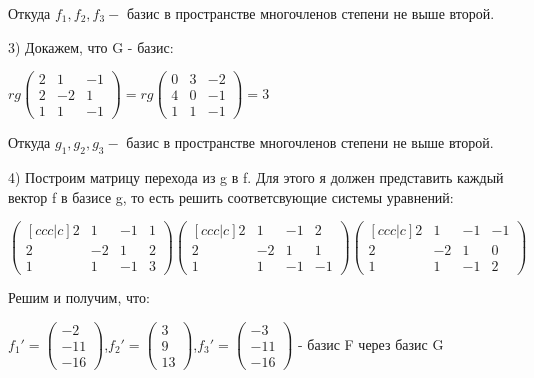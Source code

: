 \documentclass{article}
\begin{document}
Откуда $f_1,f_2,f_3 -$ базис в пространстве многочленов степени не выше второй.

3) Докажем, что G - базис:

$rg \begin{pmatrix}
    2 & 1 & -1 \\
    2 & -2 & 1 \\
    1 & 1 & -1
\end{pmatrix} = rg \begin{pmatrix}
    0 & 3 & -2 \\
    4 & 0 & -1 \\
    1& 1 & -1
\end{pmatrix} = 3 $

Откуда $g_1,g_2,g_3 -$ базис в пространстве многочленов степени не выше второй.

4) Построим матрицу перехода из g в f. Для этого я должен представить каждый вектор f в базисе g, то есть решить соответсвующие системы уравнений:

$
\begin{pmatrix}[ccc|c]
    2 & 1 & -1 &1\\
    2 & -2 & 1 &2\\
    1 & 1 & -1 &3
\end{pmatrix}
\begin{pmatrix}[ccc|c]
    2 & 1 & -1 &2\\
    2 & -2 & 1 &1\\
    1 & 1 & -1 &-1
\end{pmatrix}
\begin{pmatrix}[ccc|c]
    2 & 1 & -1 &-1\\
    2 & -2 & 1 &0\\
    1 & 1 & -1 &2
\end{pmatrix}
$

Решим и получим, что:

$f_1' = \begin{pmatrix}
    -2\\
    -11\\
    -16
\end{pmatrix}$,$f_2' = \begin{pmatrix}
    3\\
    9\\
    13
\end{pmatrix}$,$f_3' = \begin{pmatrix}
    -3\\
    -11\\
    -16
\end{pmatrix}$ - базис F через базис G
\end{document}
